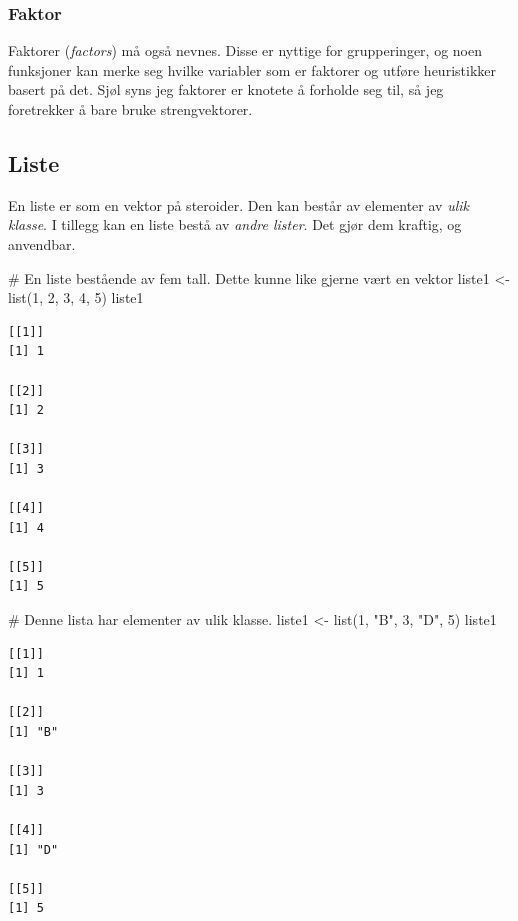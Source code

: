 \documentclass[
  letterpaper,
  DIV=11,
  numbers=noendperiod]{scrartcl}
\newenvironment{Shaded}{\begin{snugshade}}{\end{snugshade}}
\newcommand{\CommentTok}[1]{\textcolor[rgb]{0.37,0.37,0.37}{#1}}
\newcommand{\DecValTok}[1]{\textcolor[rgb]{0.68,0.00,0.00}{#1}}
\newcommand{\FunctionTok}[1]{\textcolor[rgb]{0.28,0.35,0.67}{#1}}
\newcommand{\NormalTok}[1]{\textcolor[rgb]{0.00,0.23,0.31}{#1}}
\newcommand{\OtherTok}[1]{\textcolor[rgb]{0.00,0.23,0.31}{#1}}
\newcommand{\StringTok}[1]{\textcolor[rgb]{0.13,0.47,0.30}{#1}}
\begin{document}
\hypertarget{faktor}{%
\subsubsection{Faktor}\label{faktor}}

Faktorer (\emph{factors}) må også nevnes. Disse er nyttige for
grupperinger, og noen funksjoner kan merke seg hvilke variabler som er
faktorer og utføre heuristikker basert på det. Sjøl syns jeg faktorer er
knotete å forholde seg til, så jeg foretrekker å bare bruke
strengvektorer.

\hypertarget{liste}{%
\subsection{Liste}\label{liste}}

En liste er som en vektor på steroider. Den kan består av elementer av
\emph{ulik klasse}. I tillegg kan en liste bestå av \emph{andre lister}.
Det gjør dem kraftig, og anvendbar.

\begin{Shaded}
\begin{Highlighting}[]
\CommentTok{\# En liste bestående av fem tall. Dette kunne like gjerne vært en vektor}
\NormalTok{liste1 }\OtherTok{\textless{}{-}} \FunctionTok{list}\NormalTok{(}\DecValTok{1}\NormalTok{, }\DecValTok{2}\NormalTok{, }\DecValTok{3}\NormalTok{, }\DecValTok{4}\NormalTok{, }\DecValTok{5}\NormalTok{)}
\NormalTok{liste1}
\end{Highlighting}
\end{Shaded}

\begin{verbatim}
[[1]]
[1] 1

[[2]]
[1] 2

[[3]]
[1] 3

[[4]]
[1] 4

[[5]]
[1] 5
\end{verbatim}

\begin{Shaded}
\begin{Highlighting}[]
\CommentTok{\# Denne lista har elementer av ulik klasse.}
\NormalTok{liste1 }\OtherTok{\textless{}{-}} \FunctionTok{list}\NormalTok{(}\DecValTok{1}\NormalTok{, }\StringTok{"B"}\NormalTok{, }\DecValTok{3}\NormalTok{, }\StringTok{"D"}\NormalTok{, }\DecValTok{5}\NormalTok{)}
\NormalTok{liste1}
\end{Highlighting}
\end{Shaded}

\begin{verbatim}
[[1]]
[1] 1

[[2]]
[1] "B"

[[3]]
[1] 3

[[4]]
[1] "D"

[[5]]
[1] 5
\end{verbatim}
\end{document}
